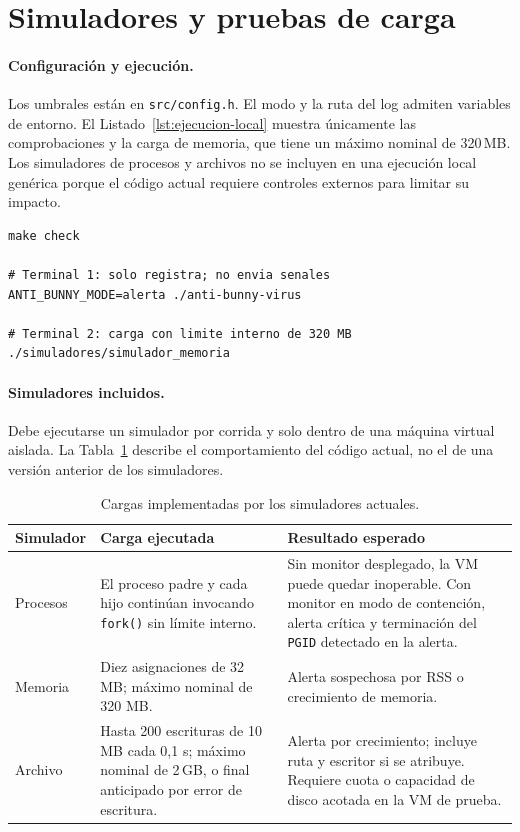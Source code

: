 \section{Simuladores y pruebas de carga}

\paragraph{Configuración y ejecución.}

Los umbrales están en \texttt{src/config.h}. El modo y la ruta del log admiten
variables de entorno. El Listado~\ref{lst:ejecucion-local} muestra únicamente
las comprobaciones y la carga de memoria, que tiene un máximo nominal de
320\,MB. Los simuladores de procesos y archivos no se incluyen en una ejecución
local genérica porque el código actual requiere controles externos para limitar
su impacto.

\begin{lstlisting}[style=comandos,caption={Comprobación previa y ejecución local de bajo riesgo.},label={lst:ejecucion-local}]
make check

# Terminal 1: solo registra; no envia senales
ANTI_BUNNY_MODE=alerta ./anti-bunny-virus

# Terminal 2: carga con limite interno de 320 MB
./simuladores/simulador_memoria
\end{lstlisting}

\paragraph{Simuladores incluidos.}

Debe ejecutarse un simulador por corrida y solo dentro de una máquina virtual
aislada. La Tabla~\ref{tab:simuladores} describe el comportamiento del código
actual, no el de una versión anterior de los simuladores.

\begin{table}[H]
  \centering
  \small
  \caption{Cargas implementadas por los simuladores actuales.}
  \label{tab:simuladores}
  \begin{tabular}{p{}p{}p{}}
    \toprule
    \textbf{Simulador} & \textbf{Carga ejecutada} & \textbf{Resultado esperado} \\
    \midrule
    Procesos & El proceso padre y cada hijo continúan invocando \texttt{fork()} sin límite interno. & Sin monitor desplegado, la VM puede quedar inoperable. Con monitor en modo de contención, alerta crítica y terminación del \texttt{PGID} detectado en la alerta. \\
    Memoria & Diez asignaciones de 32 MB; máximo nominal de 320 MB. & Alerta sospechosa por RSS o crecimiento de memoria. \\
    Archivo & Hasta 200 escrituras de 10 MB cada 0,1 s; máximo nominal de 2\,GB, o final anticipado por error de escritura. & Alerta por crecimiento; incluye ruta y escritor si se atribuye. Requiere cuota o capacidad de disco acotada en la VM de prueba. \\
    \bottomrule
  \end{tabular}
\end{table}

